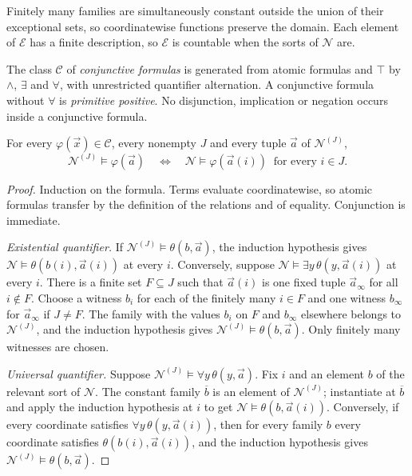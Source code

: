 Finitely many families are simultaneously constant outside the union of their
exceptional sets, so coordinatewise functions preserve the domain. Each element
of $\mathcal{E}$ has a finite description, so $\mathcal{E}$ is countable when
the sorts of $\mathcal{N}$ are.

\begin{definition}
\label{obs:def:conjunctive}
The class $\mathcal{C}$ of \emph{conjunctive formulas} is generated from atomic
formulas and $\top$ by $\wedge$, $\exists$ and $\forall$, with unrestricted
quantifier alternation. A conjunctive formula without $\forall$ is
\emph{primitive positive}. No disjunction, implication or negation occurs
inside a conjunctive formula.
\end{definition}

\begin{theorem}
\label{obs:thm:transfer}
For every $\varphi(\vec x)\in\mathcal{C}$, every nonempty $J$ and every tuple
$\vec a$ of $\mathcal{N}^{(J)}$,
\[
\mathcal{N}^{(J)}\models\varphi(\vec a)
\quad\Longleftrightarrow\quad
\mathcal{N}\models\varphi(\vec a(i))\ \text{ for every } i\in J .
\]
\end{theorem}

\begin{proof}
Induction on the formula. Terms evaluate coordinatewise, so atomic formulas
transfer by the definition of the relations and of equality. Conjunction is
immediate.

\emph{Existential quantifier.} If $\mathcal{N}^{(J)}\models\theta(b,\vec a)$,
the induction hypothesis gives $\mathcal{N}\models\theta(b(i),\vec a(i))$ at
every $i$. Conversely, suppose
$\mathcal{N}\models\exists y\,\theta(y,\vec a(i))$ at every $i$. There is a
finite set $F\subseteq J$ such that $\vec a(i)$ is one fixed tuple
$\vec a_\infty$ for all $i\notin F$. Choose a witness $b_i$ for each of the
finitely many $i\in F$ and one witness $b_\infty$ for $\vec a_\infty$ if
$J\ne F$. The family with the values $b_i$ on $F$ and $b_\infty$ elsewhere
belongs to $\mathcal{N}^{(J)}$, and the induction hypothesis gives
$\mathcal{N}^{(J)}\models\theta(b,\vec a)$. Only finitely many witnesses are
chosen.

\emph{Universal quantifier.} Suppose
$\mathcal{N}^{(J)}\models\forall y\,\theta(y,\vec a)$. Fix $i$ and an element
$b$ of the relevant sort of $\mathcal{N}$. The constant family $\overline{b}$
is an element of $\mathcal{N}^{(J)}$; instantiate at $\overline{b}$ and apply
the induction hypothesis at $i$ to get $\mathcal{N}\models\theta(b,\vec a(i))$.
Conversely, if every coordinate satisfies $\forall y\,\theta(y,\vec a(i))$,
then for every family $b$ every coordinate satisfies
$\theta(b(i),\vec a(i))$, and the induction hypothesis gives
$\mathcal{N}^{(J)}\models\theta(b,\vec a)$.
\end{proof}

